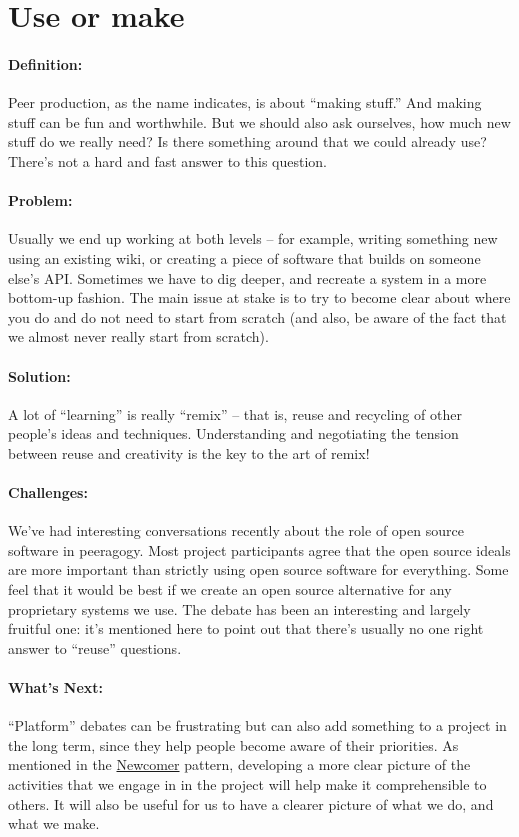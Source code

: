 \section{Use or make}
\paragraph{Definition:} Peer production, as the name indicates, is about
``making stuff.'' And making stuff can be fun and worthwhile. But we
should also ask ourselves, how much new stuff do we really need? Is
there something around that we could already use? There's not a hard and
fast answer to this question.

\paragraph{Problem:} Usually we end up working at both levels -- for
example, writing something new using an existing wiki, or creating a
piece of software that builds on someone else's API. Sometimes we have
to dig deeper, and recreate a system in a more bottom-up fashion. The
main issue at stake is to try to become clear about where you do and do
not need to start from scratch (and also, be aware of the fact that we
almost never really start from scratch).

\paragraph{Solution:} A lot of ``learning'' is really ``remix'' -- that is,
reuse and recycling of other people's ideas and techniques.
Understanding and negotiating the tension between reuse and creativity
is the key to the art of remix!

\paragraph{Challenges:} We've had interesting conversations recently about
the role of open source software in peeragogy. Most project participants
agree that the open source ideals are more important than strictly using
open source software for everything. Some feel that it would be best if
we create an open source alternative for any proprietary systems we use.
The debate has been an interesting and largely fruitful one: it's
mentioned here to point out that there's usually no one right answer to
``reuse'' questions.

\paragraph{What's Next:} ``Platform'' debates can be frustrating but can
also add something to a project in the long term, since they help people
become aware of their priorities. As mentioned in
the \href{http://peeragogy.org/patterns/newcomer/}{Newcomer} pattern,
developing a more clear picture of the activities that we engage in in
the project will help make it comprehensible to others. It will also be
useful for us to have a clearer picture of what we do, and what we make.


